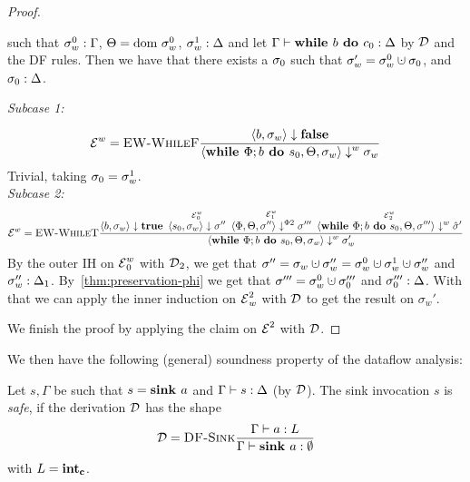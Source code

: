 \begin{proof}
\begin{claim}
        such that ${\sigma_w^0}:{\Gamma}$, $\Theta = \text{dom }{\sigma}^0_w$, ${\sigma_w^1}:{\Delta}$
        and let $\Gamma \vdash {\textbf{while }{b} \textbf{ do } {c_0}}: \Delta$ by $\operatorname{\mathcal{D}}$ and the DF rules.
        Then we have that there exists a $\sigma_0$ such that $\store_w' = \store_w^0 \dunion \store_0$,
        and ${\sigma_0}:{\Delta}$.
    \end{claim}
    \begin{claimproof}
        \emph{Subcase 1:}
        \begin{align*}
            \operatorname{\mathcal{E}}^w = \textsc{EW-WhileF}\frac{\displaystyle 
            \overset{}{\langle b, \sigma_w \rangle \downarrow \textbf{false}}}{\displaystyle \langle \textbf{while }\Phi;{b} \textbf{ do } {s_0}, \Theta, \sigma_w \rangle \downarrow^w \sigma_w}
        \end{align*}
        Trivial, taking $\sigma_0 = \sigma_w^1$.\\
        \emph{Subcase 2:}
        \begin{align*}
            \operatorname{\mathcal{E}}^w = \textsc{EW-WhileT}\frac{\displaystyle \overset{}{\langle b, \sigma_w \rangle \downarrow \textbf{true}} \enskip
            \overset{\operatorname{\mathcal{E}}^w_0}{\langle s_0, \sigma_w \rangle \downarrow \sigma''} \enskip
            \overset{\operatorname{\mathcal{E}}^w_1}{\langle \Phi, \Theta, \sigma'' \rangle \downarrow^{\Phi2} \sigma'''} \enskip
            \overset{\operatorname{\mathcal{E}}^w_2}{\langle \textbf{while }\Phi;{b} \textbf{ do } {s_0}, \Theta, \sigma''' \rangle \downarrow^w \hat{\sigma}'}}{\displaystyle \langle \textbf{while }\Phi;{b} \textbf{ do } {s_0}, \Theta, \sigma_w \rangle \downarrow^w \sigma_w'}
        \end{align*}
        By the outer IH on $\operatorname{\mathcal{E}}^w_0$ with $\operatorname{\mathcal{D}}_2$, we get that
        $\sigma'' = \sigma_w \dunion \sigma_w'' = \sigma_w^0 \dunion \sigma_w^1 \dunion \sigma_w''$
        and ${\sigma_w''}:{\Delta_1}$.
        By~\autoref{thm:preservation-phi} we get that $\store''' = \store_w^0 \dunion \store_0'''$ and
        ${\sigma_0'''}:{\Delta}$.
        With that we can apply the inner induction on $\operatorname{\mathcal{E}}^2_w$ with $\operatorname{\mathcal{D}}$ to get the result on $\sigma_w'$.
    \end{claimproof}
    We finish the proof by applying the claim on $\operatorname{\mathcal{E}}^2$ with $\operatorname{\mathcal{D}}$.
\end{proof}


We then have the following (general) soundness property of the dataflow analysis:
\begin{definition}
    Let $s, \Gamma$ be such that $s = \textbf{sink }{a}$ and $\Gamma \vdash {s}: \Delta$ (by $\operatorname{\mathcal{D}}$).
    The sink invocation $s$ is \emph{safe}, if the derivation $\operatorname{\mathcal{D}}$ has the shape
    \begin{align*}
        \operatorname{\mathcal{D}} = \textsc{DF-Sink}\frac{\displaystyle \Gamma \vdash {a}: L}{\displaystyle \Gamma \vdash {\textbf{sink }{a}}: \emptyset}
    \end{align*}
    with $L = \textbf{int}_\textbf{c}$.
\end{definition}

